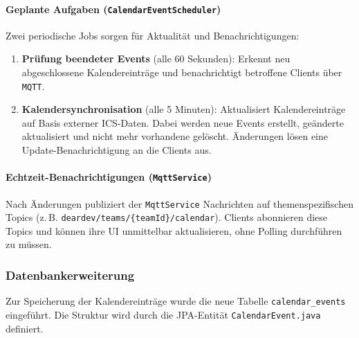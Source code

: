 \documentclass[12pt,a4paper]{report}
\begin{document}
\paragraph{Geplante Aufgaben (\texttt{CalendarEventScheduler})}
    Zwei periodische Jobs sorgen für Aktualität und Benachrichtigungen:
    \begin{enumerate}
        \item \textbf{Prüfung beendeter Events} (alle 60 Sekunden):
            Erkennt neu abgeschlossene Kalendereinträge und benachrichtigt betroffene Clients über \texttt{MQTT}.
        \item \textbf{Kalendersynchronisation} (alle 5 Minuten):
            Aktualisiert Kalendereinträge auf Basis externer ICS-Daten.
            Dabei werden neue Events erstellt, geänderte aktualisiert und nicht mehr vorhandene gelöscht.
            Änderungen lösen eine Update-Benachrichtigung an die Clients aus.
    \end{enumerate}

\paragraph{Echtzeit-Benachrichtigungen (\texttt{MqttService})}
    Nach Änderungen publiziert der \texttt{MqttService} Nachrichten auf themenspezifischen Topics (z.\,B. \texttt{deardev/teams/\{teamId\}/calendar}).
    Clients abonnieren diese Topics und können ihre UI unmittelbar aktualisieren, ohne Polling durchführen zu müssen.


\subsubsection{Datenbankerweiterung}

    Zur Speicherung der Kalendereinträge wurde die neue Tabelle \texttt{calendar\_events} eingeführt.
    Die Struktur wird durch die JPA-Entität \texttt{CalendarEvent.java} definiert.
\end{document}
